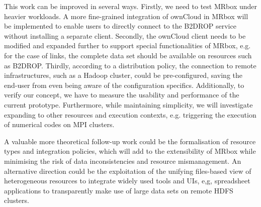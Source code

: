 This work can be improved in several ways. Firstly, we need to test MRbox under heavier workloads. A more fine-grained integration of ownCloud in MRbox will be implemented to enable users to directly connect to the B2DROP service without installing a separate client. Secondly, the ownCloud client needs to be modified and expanded further to support special functionalities of MRbox, e.g. for the case of links, the complete data set should be available on resources such as B2DROP. Thirdly, according to a distribution policy, the connection to remote infrastructures, such as a Hadoop cluster, could be pre-configured, saving the end-user from even being aware of the configuration specifics. Additionally, to verify our concept, we have to measure the usability and performance of the current prototype. Furthermore, while maintaining simplicity, we will investigate expanding to other resources and execution contexts, e.g. triggering the execution of numerical codes on MPI clusters. 

A valuable more theoretical follow-up work could be the formalisation of resource types and integration policies, which will add to the extensibility of MRbox while minimising the risk of data inconsistencies and resource mismanagement. An alternative direction could be the exploitation of the unifying files-based view of heterogeneous resources to integrate widely used tools and UIs, e,g, spreadsheet applications to transparently make use of large data sets on remote HDFS clusters.

